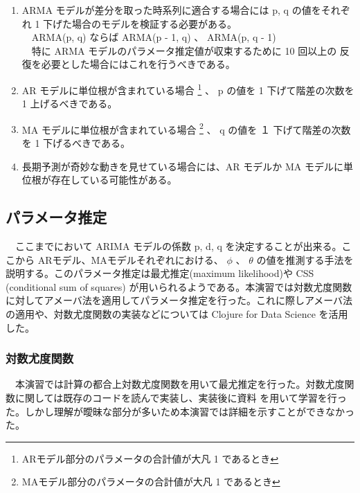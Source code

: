 \documentclass[dvipdfmx]{scrartcl}
\begin{document}
\begin{enumerate}
\item ARMA モデルが差分を取った時系列に適合する場合には p, q の値をそれぞれ 1 下げた場合のモデルを検証する必要がある。\\
　ARMA(p, q) ならば ARMA(p - 1, q) 、 ARMA(p, q - 1)\\
　特に ARMA モデルのパラメータ推定値が収束するために 10 回以上の 反復を必要とした場合にはこれを行うべきである。\\
\item AR モデルに単位根が含まれている場合 \footnote{ARモデル部分のパラメータの合計値が大凡 1 であるとき} 、 p の値を 1 下げて階差の次数を 1 上げるべきである。\\
\item MA モデルに単位根が含まれている場合 \footnote{MAモデル部分のパラメータの合計値が大凡 1 であるとき} 、 q の値を １ 下げて階差の次数を 1 下げるべきである。\\
\item 長期予測が奇妙な動きを見せている場合には、AR モデルか MA モデルに単位根が存在している可能性がある。\\
\end{enumerate}

\subsection{パラメータ推定}
\label{sec:orgb671572}
　ここまでにおいて ARIMA モデルの係数 p, d, q を決定することが出来る。ここから ARモデル、MAモデルそれぞれにおける、 \(\phi\) 、 \(\theta\) の値を推測する手法を説明する。このパラメータ推定は最尤推定(maximum likelihood)や CSS (conditional sum of squares) が用いられるようである。本演習では対数尤度関数に対してアメーバ法を適用してパラメータ推定を行った。これに際しアメーバ法の適用や、対数尤度関数の実装などについては Clojure for Data Science \cite{data-science} を活用した。\\
\subsubsection{対数尤度関数}
\label{sec:orgd32b29e}
　本演習では計算の都合上対数尤度関数を用いて最尤推定を行った。対数尤度関数に関しては既存のコードを読んで実装し、実装後に資料 \cite{log-likelihood} を用いて学習を行った。しかし理解が曖昧な部分が多いため本演習では詳細を示すことができなかった。\\
\end{document}
